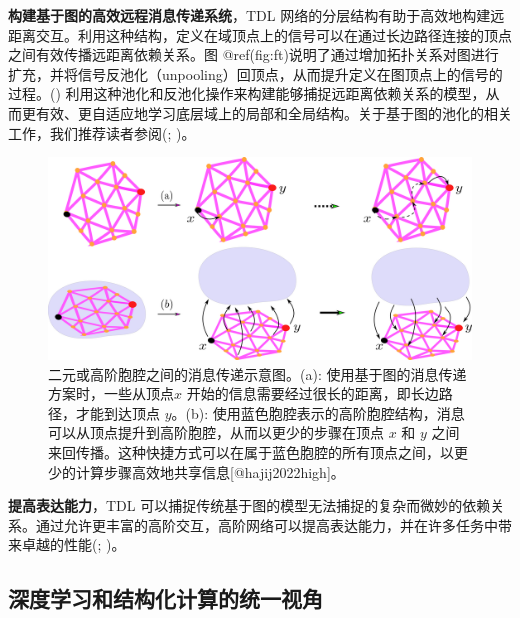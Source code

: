 \documentclass[
  12pt,
]{krantz}
\begin{document}
\textbf{构建基于图的高效远程消息传递系统}，TDL
网络的分层结构有助于高效地构建远距离交互。利用这种结构，定义在域顶点上的信号可以在通过长边路径连接的顶点之间有效传播远距离依赖关系。图
@ref(fig:ft)说明了通过增加拓扑关系对图进行扩充，并将信号反池化（unpooling）回顶点，从而提升定义在图顶点上的信号的过程。()
利用这种池化和反池化操作来构建能够捕捉远距离依赖关系的模型，从而更有效、更自适应地学习底层域上的局部和全局结构。关于基于图的池化的相关工作，我们推荐读者参阅(; )。

\begin{figure}

{\centering \includegraphics{figures/factors_thru} 

}

\caption{二元或高阶胞腔之间的消息传递示意图。(a): 使用基于图的消息传递方案时，一些从顶点$x$ 开始的信息需要经过很长的距离，即长边路径，才能到达顶点 $y$。(b): 使用蓝色胞腔表示的高阶胞腔结构，消息可以从顶点提升到高阶胞腔，从而以更少的步骤在顶点 $x$ 和 $y$ 之间来回传播。这种快捷方式可以在属于蓝色胞腔的所有顶点之间，以更少的计算步骤高效地共享信息[@hajij2022high]。}\label{fig:ft}
\end{figure}

\textbf{提高表达能力}，TDL
可以捕捉传统基于图的模型无法捕捉的复杂而微妙的依赖关系。通过允许更丰富的高阶交互，高阶网络可以提高表达能力，并在许多任务中带来卓越的性能(; )。

\subsection{深度学习和结构化计算的统一视角}\label{ux6df1ux5ea6ux5b66ux4e60ux548cux7ed3ux6784ux5316ux8ba1ux7b97ux7684ux7edfux4e00ux89c6ux89d2}
\end{document}
